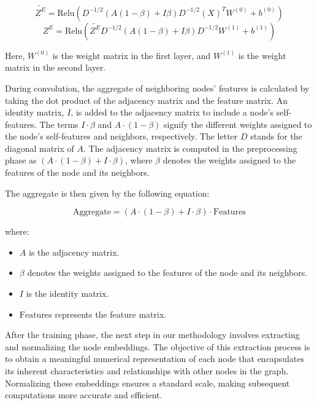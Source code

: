 \documentclass[10pt,twocolumn,a4paper]{article}
\begin{document}
\begin{small}
\begin{equation}
        \widetilde{Z^E}=\text{Relu}\left(D^{-1/2}(A(1-\beta)+I\beta)D^{-1/2} (X)^T W^{(0)}+b^{(0)}\right)
\end{equation}
\begin{equation}
         {Z^E}=\text{Relu}\left( \widetilde{Z^E}  D^{-1/2}(A(1-\beta)+I\beta)D^{-1/2}   W^{(1)}+b^{(1)}\right)
\end{equation}
\end{small}



Here, $W^{(0)}$ is the weight matrix in the first layer, and $W^{(1)}$ is the weight matrix in the second layer.

During convolution, the aggregate of neighboring nodes' features is calculated by taking the dot product of the adjacency matrix and the feature matrix. An identity matrix, $I$, is added to the adjacency matrix to include a node's self-features. The terms $I \cdot \beta$ and $A \cdot (1 - \beta)$ signify the different weights assigned to the node's self-features and neighbors, respectively. The letter $D$ stands for the diagonal matrix of $A$. The adjacency matrix is computed in the preprocessing phase as $(A \cdot (1 - \beta) + I \cdot \beta)$, where $\beta$ denotes the weights assigned to the features of the node and its neighbors.

The aggregate is then given by the following equation:

\begin{equation*}
\text{Aggregate} = (A \cdot (1 - \beta) + I \cdot \beta) \cdot \text{Features}
\end{equation*}

where:
\begin{itemize}
  \item $A$ is the adjacency matrix.
  \item $\beta$ denotes the weights assigned to the features of the node and its neighbors.
  \item $I$ is the identity matrix.
  \item $\text{Features}$ represents the feature matrix.
\end{itemize}


After the training phase, the next step in our methodology involves extracting and normalizing the node embeddings. The objective of this extraction process is to obtain a meaningful numerical representation of each node that encapsulates its inherent characteristics and relationships with other nodes in the graph. Normalizing these embeddings ensures a standard scale, making subsequent computations more accurate and efficient.
\end{document}
